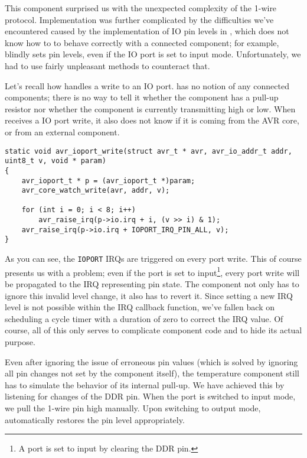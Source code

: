 This component surprised us with the unexpected complexity of the 1-wire protocol.
Implementation was further complicated by the difficulties we've encountered
caused by the implementation of \ac{IO} pin levels
in \simavr, which does not know how to to behave correctly with a connected
component; for example, \simavr blindly sets pin levels, even if the \ac{IO} port
is set to input mode. Unfortunately, we had to use fairly unpleasant methods to
counteract that.

Let's recall how \simavr handles a write to an \ac{IO} port. \simavr has no
notion of any connected components; there is no way to tell it whether the component
has a pull-up resistor nor whether the component is currently transmitting high
or low. When \simavr receives a \ac{IO} port write, it also does not know
if it is coming from the \ac{AVR} core, or from an external component.

\begin{lstlisting}
static void avr_ioport_write(struct avr_t * avr, avr_io_addr_t addr, uint8_t v, void * param)
{
    avr_ioport_t * p = (avr_ioport_t *)param;
    avr_core_watch_write(avr, addr, v);

    for (int i = 0; i < 8; i++)
        avr_raise_irq(p->io.irq + i, (v >> i) & 1);
    avr_raise_irq(p->io.irq + IOPORT_IRQ_PIN_ALL, v);
}
\end{lstlisting}

As you can see, the \lstinline|IOPORT| \acp{IRQ} are triggered on every port write.
This of course presents us with a problem; even if the port is set to input\footnote{
%
A port is set to input by clearing the \ac{DDR} pin.
%
}, every port write will be propagated to the \ac{IRQ} representing pin state. The component
not only has to ignore this invalid level change, it also has to revert it.
Since setting a new \ac{IRQ} level is not possible within the \ac{IRQ} callback function,
we've fallen back on scheduling a cycle timer with a duration of zero to correct
the \ac{IRQ} value. Of course, all of this only serves to complicate component
code and to hide its actual purpose.

Even after ignoring the issue of erroneous pin values (which is solved by ignoring
all pin changes not set by the component itself), the temperature component
still has to simulate the behavior of its internal pull-up. We have achieved this
by listening for changes of the \ac{DDR} pin. When the port is switched to input mode,
we pull the 1-wire pin high manually. Upon switching to output mode, \simavr
automatically restores the pin level appropriately.

